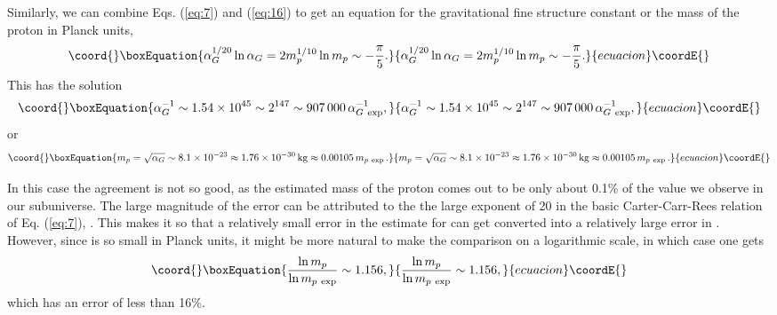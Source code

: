 \documentclass[a4paper,12pt]{article}
\begin{document}
	Similarly, we can combine Eqs. (\ref{eq:7}) and (\ref{eq:16})
to get an equation for the gravitational fine structure constant
\coordHE{} or the mass \coordHE{} of the proton
in Planck units,
 \begin{equation}\coord{}\boxEquation{
 \alpha_G^{1/20}\ln{\alpha_G} = 2 m_p^{1/10}\ln{m_p}
                     \sim -{\pi\over 5}.
 \label{eq:25}
 }{
 \alpha_G^{1/20}\ln{\alpha_G} = 2 m_p^{1/10}\ln{m_p}
                     \sim -{\pi\over 5}.
 }{ecuacion}\coordE{}\end{equation}
This has the solution
 \begin{equation}\coord{}\boxEquation{
 \alpha_G^{-1} \sim 1.54 \times 10^{45} \sim 2^{147}
 \sim 907\,000 \, \alpha_{G\ \mathrm{exp}}^{-1},
 \label{eq:26}
 }{
 \alpha_G^{-1} \sim 1.54 \times 10^{45} \sim 2^{147}
 \sim 907\,000 \, \alpha_{G\ \mathrm{exp}}^{-1},
 }{ecuacion}\coordE{}\end{equation}
or
 \begin{equation}\coord{}\boxEquation{
 m_p = \sqrt{\alpha_G} \sim 8.1 \times 10^{-23}
 \approx 1.76 \times 10^{-30} \, \mathrm{kg}
 \approx 0.00105 \, m_{p\ \mathrm{exp}}\,.
 \label{eq:27}
 }{
 m_p = \sqrt{\alpha_G} \sim 8.1 \times 10^{-23}
 \approx 1.76 \times 10^{-30} \, \mathrm{kg}
 \approx 0.00105 \, m_{p\ \mathrm{exp}}\,.
 }{ecuacion}\coordE{}\end{equation}

	In this case the agreement is not so good,
as the estimated mass of the proton
comes out to be only about 0.1\% of the value
we observe in our subuniverse.
The large magnitude of the error can be attributed
to the the large exponent of 20 in
the basic Carter-Carr-Rees relation of Eq. (\ref{eq:7}),
\coordHE{}.
This makes it so that a relatively small error
in the estimate for \myHighlight{$\alpha$}\coordHE{} can get converted
into a relatively large error in \coordHE{}.
However, since \coordHE{} is so small in Planck units,
it might be more natural to make the comparison
on a logarithmic scale, in which case one gets
 \begin{equation}\coord{}\boxEquation{
 {\ln{m_p}\over \ln{m_{p\ \mathrm{exp}}}} \sim 1.156,
 \label{eq:28}
 }{
 {\ln{m_p}\over \ln{m_{p\ \mathrm{exp}}}} \sim 1.156,
 }{ecuacion}\coordE{}\end{equation}
which has an error of less than 16\%.
\end{document}
